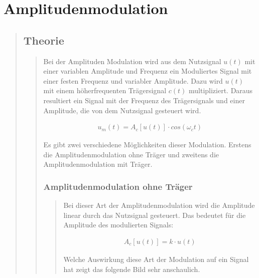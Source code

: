 \section{Amplitudenmodulation}
\begin{quote}
	\subsection{Theorie}
    \begin{quote}
        Bei der Amplituden Modulation wird aus dem Nutzsignal $u(t)$ mit einer variablen Amplitude und Frequenz ein
        Moduliertes Signal mit einer festen Frequenz und variabler Amplitude. Dazu wird $u(t)$ mit einem
        höherfrequenten Trägersignal $c(t)$ multipliziert. Daraus resultiert ein Signal mit der Frequenz des
        Trägersignals und einer Amplitude, die von dem Nutzsignal gesteuert wird.
        
        \begin{equation*}
        	\begin{split}
        		u_m(t) = A_c [u(t)] \cdot cos(\omega_c t)
        	\end{split}
        \end{equation*}
        
        Es gibt zwei verschiedene Möglichkeiten dieser Modulation. Erstens die Amplitudenmodulation ohne Träger und
        zweitens die Amplitudenmodulation mit Träger.
        
        \subsubsection{Amplitudenmodulation ohne Träger}
		\begin{quote}
			Bei dieser Art der Amplitudenmodulation wird die Amplitude linear durch das Nutzsignal gesteuert. Das bedeutet für
			die Amplitude des modulierten Signals:
			
			\begin{equation*}
            	\begin{split}
            		A_c [u(t)] = k \cdot u(t)
            	\end{split}
            \end{equation*}
            
            
            Welche Auswirkung diese Art der Modulation auf ein Signal hat zeigt das folgende Bild sehr anschaulich. 
            

\end{quote}
\end{quote}
\end{quote}
